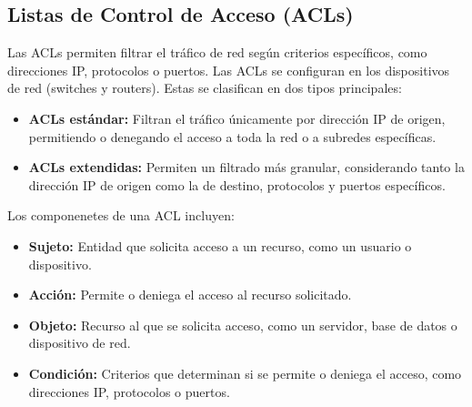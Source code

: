 \subsection{Listas de Control de Acceso (ACLs)}
\label{subsec:acl}
Las ACLs permiten filtrar el tráfico de red según criterios específicos, como direcciones IP, protocolos o puertos. Las ACLs se configuran en los dispositivos de red (switches y routers). Estas se 
clasifican en dos tipos principales:

\begin{itemize}
    \item \textbf{ACLs estándar:} Filtran el tráfico únicamente por dirección IP de origen, permitiendo o denegando el acceso a toda la red o a subredes específicas.
    \item \textbf{ACLs extendidas:} Permiten un filtrado más granular, considerando tanto la dirección IP de origen como la de destino, protocolos y puertos específicos.
\end{itemize}

Los componenetes de una ACL incluyen:
\begin{itemize}
    \item \textbf{Sujeto:} Entidad que solicita acceso a un recurso, como un usuario o dispositivo.
    \item \textbf{Acción:} Permite o deniega el acceso al recurso solicitado.
    \item \textbf{Objeto:} Recurso al que se solicita acceso, como un servidor, base de datos o dispositivo de red.
    \item \textbf{Condición:} Criterios que determinan si se permite o deniega el acceso, como direcciones IP, protocolos o puertos.
\end{itemize}


